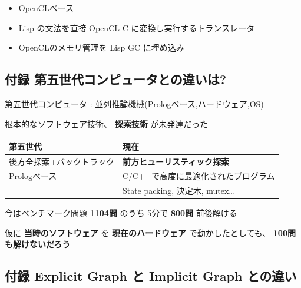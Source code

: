 \begin{itemize}
\item OpenCLベース
\item Lisp の文法を直接 OpenCL C に変換し実行するトランスレータ
\item OpenCLのメモリ管理を Lisp GC に埋め込み
\end{itemize}

\subsection{付録 第五世代コンピュータとの違いは?}
\label{sec-5-10}

第五世代コンピュータ : 並列推論機械(Prologベース,ハードウェア,OS)

根本的なソフトウェア技術、 \textbf{探索技術} が未発達だった

\begin{center}
\begin{tabular}{ll}
第五世代 & 現在\\
\hline
後方全探索+バックトラック & \textbf{前方ヒューリスティック探索}\\
Prologベース & C/C++で高度に最適化されたプログラム\\
 & State packing, 決定木, mutex\ldots{}\\
\end{tabular}
\end{center}

今はベンチマーク問題 \textbf{1104問} のうち 5分で \textbf{800問} 前後解ける

仮に \textbf{当時のソフトウェア} を \textbf{現在のハードウェア} で動かしたとしても、 \textbf{100問も解けないだろう}

\subsection{付録 Explicit Graph と Implicit Graph との違い}
\label{sec-5-11}


